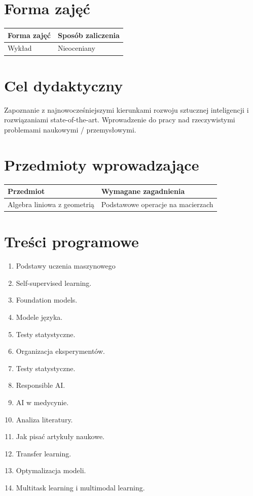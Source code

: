 \documentclass[12pt, a4paper]{article}
\begin{document}
\section{Forma zajęć}

\begin{tabular}{ll}
  \hline
  \textbf{Forma zajęć} & \textbf{Sposób zaliczenia} \\
  \hline
  Wykład & Nieoceniany \\
  \hline
\end{tabular}

\section{Cel dydaktyczny}

Zapoznanie z najnowocześniejszymi kierunkami rozwoju sztucznej inteligencji i rozwiązaniami state-of-the-art. Wprowadzenie do pracy nad rzeczywistymi problemami naukowymi / przemysłowymi.

\section{Przedmioty wprowadzające}

\begin{tabularx}{\textwidth}{lX}
  \hline
  \textbf{Przedmiot} & \textbf{Wymagane zagadnienia} \\
  \hline
  Algebra liniowa z geometrią & Podstawowe operacje na macierzach \\
  \hline
\end{tabularx}

\section{Treści programowe}

\begin{enumerate}
  \item Podstawy uczenia maszynowego
  \item Self-supervised learning.
  \item Foundation models.
  \item Modele języka.
  \item Testy statystyczne.
  \item Organizacja eksperymentów.
  \item Testy statystyczne.
  \item Responsible AI.
  \item AI w medycynie.
  \item Analiza literatury.
  \item Jak pisać artykuły naukowe.
  \item Transfer learning.
  \item Optymalizacja modeli.
  \item Multitask learning i multimodal learning.
\end{enumerate}
\end{document}
